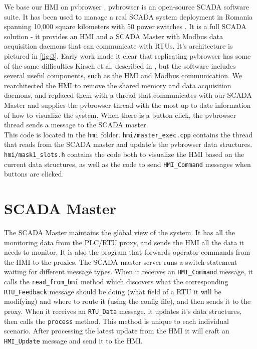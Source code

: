 \documentclass[oneside,11pt,a4paper,oldfontcommands]{book}
\def\code#1{\texttt{#1}}
\begin{document}
\indent \indent
We base our HMI on pvbrowser \cite{pvbrowser}.
pvbrowser is an open-source SCADA 
software suite. It has been used to manage a real SCADA system deployment
in Romania spanning 10,000 square kilometers with 50 power switches \cite{pvbrowser}.
It is a full SCADA solution - it provides an HMI and a SCADA Master with Modbus
data acquisition daemons that can communicate with RTUs. It's architecture is pictured
in \ref{fig:3}. Early work made it clear that replicating pvbrowser has some of the
same difficulties Kirsch et al. described in \cite{SurvivableSCADA}
, but the software includes several useful components, such as the HMI and Modbus
communication. 
We rearchitected the HMI to remove the shared memory and
data acquisition daemons, and replaced them with a thread that communicates with our
SCADA Master and supplies the pvbrowser thread with the most up to date information of
how to visualize the system. When there is a button click, the pvbrowser thread
sends a message to the SCADA master. \\

\indent 
This code is located in the \code{hmi} folder. \code{hmi/master\_exec.cpp} contains the thread
that reads from the SCADA master and update's the pvbrowser data structures.
\code{hmi/mask1\_slots.h} contains the code both to visualize the HMI based on the
current data structures, as well as the code to send \code{HMI\_Command} messages
when buttons are clicked. \\

\section{SCADA Master}

\indent \indent


The SCADA Master maintains the global view of the system. It has all the monitoring
data from the PLC/RTU proxy, and sends the HMI all the data it needs to monitor.
It is also the program that forwards operator commands from the HMI to the proxies.
The SCADA master server runs a switch
statement waiting for different message types. When it receives an \code{HMI\_Command}
message, it calls the \code{read\_from\_hmi} method which discovers what the corresponding
\code{RTU\_Feedback} message
should be doing (what field of a RTU it will be modifying) and where to route it (using the config
file),
and then sends it to the proxy. When it receives an \code{RTU\_Data} message, it updates
it's data structures, then calls the \code{process} method. This method is unique
to each individual scenario. After processing the latest update from the HMI it 
will craft an \code{HMI\_Update} message
and send it to the HMI. \\
\end{document}
